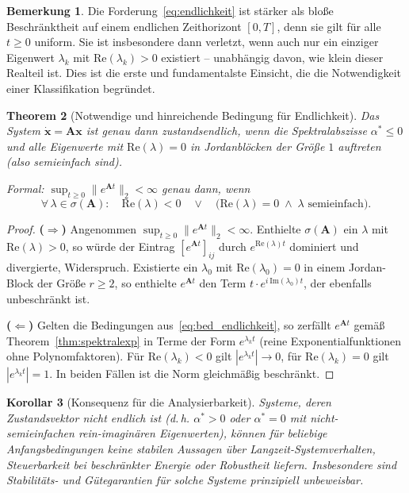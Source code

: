 \documentclass[a4paper, 12pt, twoside, openright]{report}
\newtheorem{theorem}{Theorem}[section]
\newtheorem{corollary}[theorem]{Korollar}
\theoremstyle{definition}
\newtheorem{remark}[theorem]{Bemerkung}
\theoremstyle{definition}
\newcommand{\vx}{\bm{x}}
\newcommand{\vA}{\bm{A}}
\newcommand{\spec}{\sigma}
\newcommand{\re}{\mathrm{Re}}
\newcommand{\im}{\mathrm{Im}}
\begin{document}
\begin{remark}
Die Forderung~\eqref{eq:endlichkeit} ist stärker als bloße Beschränktheit auf einem
endlichen Zeithorizont $[0, T]$, denn sie gilt für alle $t \geq 0$ uniform. Sie ist
insbesondere dann verletzt, wenn auch nur ein einziger Eigenwert $\lambda_k$ mit
$\re(\lambda_k) > 0$ existiert -- unabhängig davon, wie klein dieser Realteil ist.
Dies ist die erste und fundamentalste Einsicht, die die Notwendigkeit einer
Klassifikation begründet.
\end{remark}

\begin{theorem}[Notwendige und hinreichende Bedingung für Endlichkeit]
\label{thm:endlichkeit}
Das System $\dot{\vx} = \vA\vx$ ist genau dann zustandsendlich, wenn die
Spektralabszisse $\alpha^* \leq 0$ und alle Eigenwerte mit $\re(\lambda) = 0$ in
Jordanblöcken der Größe $1$ auftreten (also semieinfach sind).

Formal: $\sup_{t \geq 0}\|e^{\vA t}\|_2 < \infty$ genau dann, wenn
\begin{equation}
  \forall\,\lambda \in \spec(\vA):\quad
  \re(\lambda) < 0 \quad\vee\quad
  \bigl(\re(\lambda) = 0 \;\wedge\; \text{$\lambda$ semieinfach}\bigr).
  \label{eq:bed_endlichkeit}
\end{equation}
\end{theorem}

\begin{proof}
\textbf{($\Rightarrow$)} Angenommen $\sup_{t\geq 0}\|e^{\vA t}\|_2 < \infty$.
Enthielte $\spec(\vA)$ ein $\lambda$ mit $\re(\lambda) > 0$, so würde der Eintrag
$[e^{\vA t}]_{ij}$ durch $e^{\re(\lambda)t}$ dominiert und divergierte, Widerspruch.
Existierte ein $\lambda_0$ mit $\re(\lambda_0) = 0$ in einem Jordan-Block der Größe
$r \geq 2$, so enthielte $e^{\vA t}$ den Term $t \cdot e^{i\,\im(\lambda_0)t}$, der
ebenfalls unbeschränkt ist.

\textbf{($\Leftarrow$)} Gelten die Bedingungen aus~\eqref{eq:bed_endlichkeit}, so
zerfällt $e^{\vA t}$ gemäß Theorem~\ref{thm:spektralexp} in Terme der Form
$e^{\lambda_k t}$ (reine Exponentialfunktionen ohne Polynomfaktoren). Für
$\re(\lambda_k) < 0$ gilt $|e^{\lambda_k t}| \to 0$, für $\re(\lambda_k) = 0$ gilt
$|e^{\lambda_k t}| = 1$. In beiden Fällen ist die Norm gleichmäßig beschränkt. \qedhere
\end{proof}

\begin{corollary}[Konsequenz für die Analysierbarkeit]
\label{cor:analysierbarkeit}
Systeme, deren Zustandsvektor nicht endlich ist (d.\,h. $\alpha^* > 0$ oder
$\alpha^* = 0$ mit nicht-semieinfachen rein-imaginären Eigenwerten), können für
beliebige Anfangsbedingungen keine stabilen Aussagen über Langzeit-Systemverhalten,
Steuerbarkeit bei beschränkter Energie oder Robustheit liefern. Insbesondere sind
Stabilitäts- und Gütegarantien für solche Systeme prinzipiell unbeweisbar.
\end{corollary}
\end{document}
